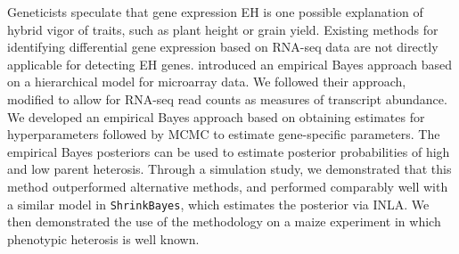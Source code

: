 \documentclass[useAMS,usenatbib,referee]{biom}
\newcommand{\ShrinkBayes}{{\tt ShrinkBayes}}
\newcommand{\RNAseq}{RNA-seq}
\begin{document}
Geneticists speculate that gene expression EH is one possible explanation of hybrid vigor of traits, such as plant height or grain yield. Existing methods for identifying differential gene expression based on \RNAseq{} data are not directly applicable for detecting EH genes. \cite{ji2014estimation} introduced an empirical Bayes approach based on a hierarchical model for microarray data. We followed their approach, modified to allow for \RNAseq{} read counts as measures of transcript abundance. We developed an empirical Bayes approach based on obtaining estimates for hyperparameters followed by MCMC to estimate gene-specific parameters. The empirical Bayes posteriors can be used to estimate posterior probabilities of high and low parent heterosis. Through a simulation study, we demonstrated that this method outperformed alternative methods, and performed comparably well with a similar model in \ShrinkBayes{}, which estimates the posterior via INLA. We then demonstrated the use of the methodology on a maize experiment in which phenotypic heterosis is well known. 
\end{document}
